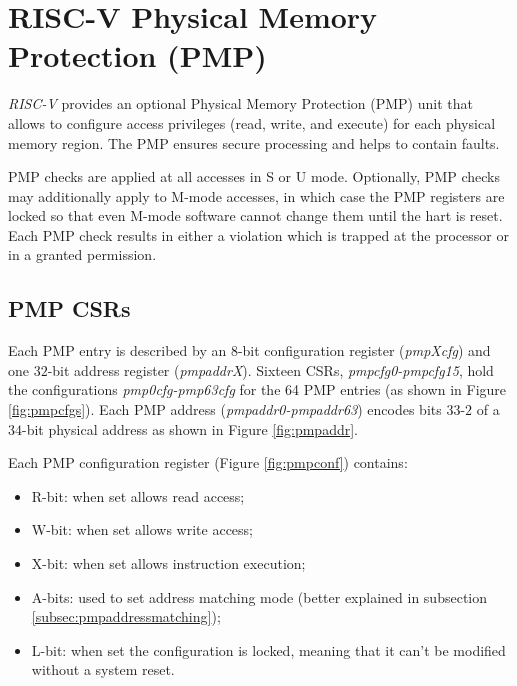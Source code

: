\section{RISC-V Physical Memory Protection (PMP)}
\label{sec:riscv_pmp}

\textit{RISC-V} provides an optional Physical Memory Protection (PMP) unit that allows
to configure access privileges (read, write, and execute) for each physical memory
region. The PMP ensures secure processing and helps to contain faults.

PMP checks are applied at all accesses in S or U mode. Optionally, PMP checks
may additionally apply to M-mode accesses, in which case the PMP registers are locked
so that even M-mode software cannot change them until the hart is reset. Each
PMP check results in either a violation which is trapped at the processor or in
a granted permission.

\subsection{PMP CSRs}
\label{subsec:riscv_pmpcsr}

Each PMP entry is described by an 8-bit configuration register (\textit{pmpXcfg})
and one $32$-bit address register (\textit{pmpaddrX}). Sixteen CSRs, \textit{pmpcfg0-pmpcfg15},
hold the configurations \textit{pmp0cfg-pmp63cfg} for the 64 PMP entries (as shown
in Figure \ref{fig:pmpcfgs}). Each PMP address (\textit{pmpaddr0-pmpaddr63})
encodes bits $33$-$2$ of a $34$-bit physical address as shown in Figure
\ref{fig:pmpaddr}.

Each PMP configuration register (Figure \ref{fig:pmpconf}) contains:
\begin{itemize}[noitemsep]
  \item R-bit: when set allows read access;

  \item W-bit: when set allows write access;

  \item X-bit: when set allows instruction execution;

  \item A-bits: used to set address matching mode (better explained in subsection
    \ref{subsec:pmpaddressmatching});

  \item L-bit: when set the configuration is locked, meaning that it can't be modified
    without a system reset.
\end{itemize}

